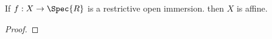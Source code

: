 \begin{lemma}
If $f:X \rightarrow \Spec{R}$ is a restrictive open immersion. 
then $X$ is affine.
\end{lemma}
\begin{proof}
\end{proof}